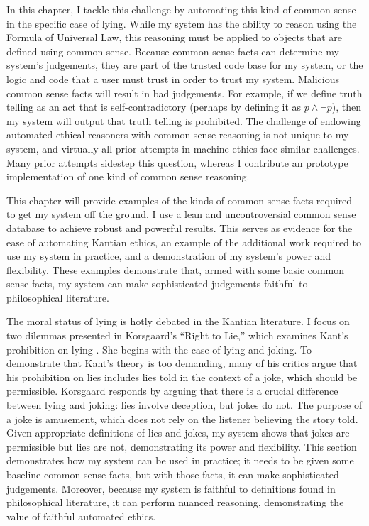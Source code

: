 \begin{isabellebody}
\begin{isamarkuptext}
In this chapter, I tackle this challenge by automating this kind of common sense in the 
specific case of lying. While my system has the ability to reason
using the Formula of Universal Law, this reasoning must be applied to objects that are defined
using common sense. Because common sense facts can determine my system's judgements, they are part of the trusted
code base for my system, or the logic and code that a user must trust in order to trust my system. 
Malicious common sense facts will result in bad judgements.
For example, if we define truth telling as an act that is self-contradictory (perhaps
by defining it as $p \wedge \neg p$), then my system will output that truth telling is prohibited.
The challenge of endowing automated ethical reasoners with common sense reasoning is not unique to my 
system, and virtually all prior attempts in machine ethics face similar challenges. Many prior attempts
sidestep this question, whereas I contribute an prototype implementation of one kind of common sense reasoning.

This chapter will provide examples of the kinds of common sense facts required to get my system
off the ground. I use a lean and uncontroversial common sense database
to achieve robust and powerful results. This serves as evidence for the ease of automating
Kantian ethics, an example of the additional work required to use my system in practice, and a 
demonstration of my system's power and flexibility. These examples demonstrate that, armed with some basic 
common sense facts, my system can make sophisticated judgements faithful to philosophical literature.%
\end{isamarkuptext}\isamarkuptrue%
%
\isadelimdocument
%
\endisadelimdocument
%
\isatagdocument
%
\isamarkuptrue%
%
\endisatagdocument
{\isafolddocument}%
%
\isadelimdocument
%
\endisadelimdocument
%
\begin{isamarkuptext}%
The moral status of lying is hotly debated in the Kantian literature. I focus on two dilemmas
presented in Korsgaard's ``Right to Lie,'' which 
examines Kant's prohibition on lying \citep{KorsgaardRTL}. She begins with the case of 
lying and joking. To demonstrate that Kant's theory is too demanding, many of his critics argue that 
his prohibition on lies includes lies told in the context of a joke, which should be permissible. Korsgaard responds by arguing 
that there is a crucial difference between lying and joking: lies involve deception, but jokes do not. 
The purpose of a joke is amusement, which does not rely on the listener believing the story told. 
Given appropriate definitions of lies and jokes, my system shows that jokes are permissible but lies 
are not, demonstrating its power and flexibility. This section demonstrates how my system can be used 
in practice; it needs to be given some baseline common sense facts, but with those facts, it can make 
sophisticated judgements. Moreover, because my system is faithful to definitions found in philosophical 
literature, it can perform nuanced reasoning, demonstrating the value of faithful automated ethics. 


\end{isamarkuptext}
\end{isabellebody}
